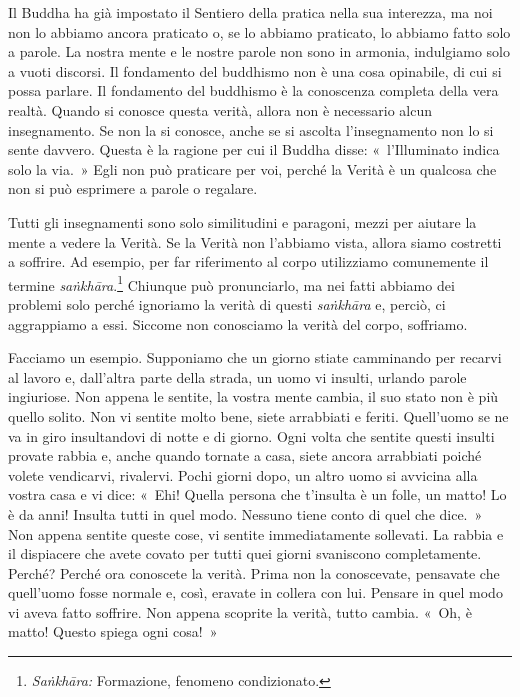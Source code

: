 Il Buddha ha già impostato il Sentiero della pratica nella sua
interezza, ma noi non lo abbiamo ancora praticato o, se lo abbiamo
praticato, lo abbiamo fatto solo a parole. La nostra mente e le nostre
parole non sono in armonia, indulgiamo solo a vuoti discorsi. Il
fondamento del buddhismo non è una cosa opinabile, di cui si possa
parlare. Il fondamento del buddhismo è la conoscenza completa della vera
realtà. Quando si conosce questa verità, allora non è necessario alcun
insegnamento. Se non la si conosce, anche se si ascolta l'insegnamento
non lo si sente davvero. Questa è la ragione per cui il Buddha disse:
«~l'Illuminato indica solo la via.~» Egli non può praticare per voi,
perché la Verità è un qualcosa che non si può esprimere a parole o
regalare.

Tutti gli insegnamenti sono solo similitudini e paragoni, mezzi per
aiutare la mente a vedere la Verità. Se la Verità non l'abbiamo vista,
allora siamo costretti a soffrire. Ad esempio, per far riferimento al
corpo utilizziamo comunemente il termine \emph{saṅkhāra}.\footnote{\emph{Saṅkhāra:}
  Formazione, fenomeno condizionato.} Chiunque può pronunciarlo, ma nei
fatti abbiamo dei problemi solo perché ignoriamo la verità di questi
\emph{saṅkhāra} e, perciò, ci aggrappiamo a essi. Siccome non conosciamo
la verità del corpo, soffriamo.

Facciamo un esempio. Supponiamo che un giorno stiate camminando per
recarvi al lavoro e, dall'altra parte della strada, un uomo vi insulti,
urlando parole ingiuriose. Non appena le sentite, la vostra mente
cambia, il suo stato non è più quello solito. Non vi sentite molto bene,
siete arrabbiati e feriti. Quell'uomo se ne va in giro insultandovi di
notte e di giorno. Ogni volta che sentite questi insulti provate rabbia
e, anche quando tornate a casa, siete ancora arrabbiati poiché volete
vendicarvi, rivalervi. Pochi giorni dopo, un altro uomo si avvicina alla
vostra casa e vi dice: «~Ehi! Quella persona che t'insulta è un folle,
un matto! Lo è da anni! Insulta tutti in quel modo. Nessuno tiene conto
di quel che dice.~» Non appena sentite queste cose, vi sentite
immediatamente sollevati. La rabbia e il dispiacere che avete covato per
tutti quei giorni svaniscono completamente. Perché? Perché ora conoscete
la verità. Prima non la conoscevate, pensavate che quell'uomo fosse
normale e, così, eravate in collera con lui. Pensare in quel modo vi
aveva fatto soffrire. Non appena scoprite la verità, tutto cambia. «~Oh,
è matto! Questo spiega ogni cosa!~»

